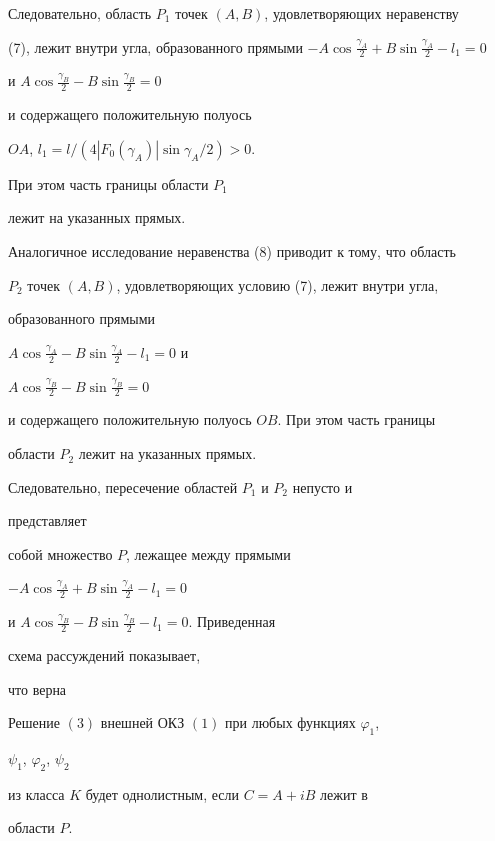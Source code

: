  


Следовательно, область $P_1$ точек $(A,B)$, удовлетворяющих неравенству 


(7), лежит внутри угла, образованного прямыми $-A\cos\frac{\gamma_A}{2} 


+B\sin\frac{\gamma_A}{2}-l_1=0$ 


и $A\cos\frac{\gamma_B}{2}-B\sin\frac{\gamma_B}{2}=0$ 


и содержащего положительную полуось  


$OA$, $l_1=l/(4|F_0(\gamma_A)|\sin\gamma_A/2)>0$. 


При этом часть границы области $P_1$  


лежит на указанных прямых. 


 


Аналогичное исследование неравенства (8) приводит к тому, что область 


$P_2$ точек $(A,B)$, удовлетворяющих условию (7), лежит внутри угла,  


образованного прямыми 


$A\cos\frac{\gamma_A}{2}-B\sin\frac{\gamma_A}{2}-l_1=0$ и 


$A\cos\frac{\gamma_B}{2}-B\sin\frac{\gamma_B}{2}=0$ 


и содержащего положительную полуось $OB$. При этом часть границы  


области $P_2$ лежит на указанных прямых. 


 


Следовательно, пересечение областей $P_1$ и $P_2$ непусто и 


представляет  


собой множество $P$, лежащее между прямыми 


$-A\cos\frac{\gamma_A}{2}+B\sin\frac{\gamma_A}{2}-l_1=0$ 


и $A\cos\frac{\gamma_B}{2}-B\sin\frac{\gamma_B}{2}-l_1=0$. Приведенная 


схема рассуждений показывает,  


что верна 


 


\begin{thmnonum} 


Решение $(3)$ внешней ОКЗ $(1)$ при любых функциях $\varphi_1$, 


$\psi_1$, $\varphi_2$, $\psi_2$ 


из класса $K$ будет однолистным, если $C=A+iB$ лежит в 


области $P$. 


\end{thmnonum} 


